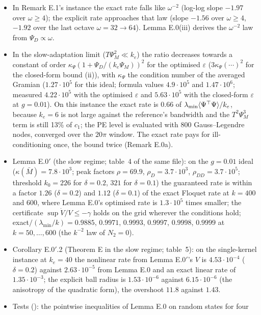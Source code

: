 \begin{itemize}
  \item In Remark E.1's instance the exact rate falls like $\omega^{-2}$ (log-log slope $-1.97$ over $\omega\ge4$);
    the explicit rate approaches that law (slope $-1.56$ over $\omega\ge4$, $-1.92$ over the last octave
    $\omega=32\to64$). Lemma E.0(iii) derives the $\omega^{-2}$ law from $\Psi_D\propto\omega$.
  \item In the slow-adaptation limit ($T\Psi_M^2\ll k_e$) the ratio decreases towards a constant of order
    $\kappa_\Psi(1+\Psi_D/(k_e\Psi_M))^2$ for the optimised $\varepsilon$ ($3\kappa_\Psi(\cdots)^2$ for the
    closed-form bound (ii)), with $\kappa_\Psi$ the condition number of the averaged Gramian ($1.27\cdot10^5$ for this
    ideal; formula values $4.9\cdot10^5$ and $1.47\cdot10^6$; measured $4.22\cdot10^5$ with the optimised $\varepsilon$
    and $5.63\cdot10^5$ with the closed-form $\varepsilon$ at $g=0.01$). On this instance the exact rate is $0.66$ of
    $\lambda_{\min}\langle\Psi^\top\Psi\rangle/k_e$, because $k_e=6$ is not large against the reference's bandwidth and
    the $T^2\Psi_M^3$ term is still 13\% of $c_1$; the PE level is evaluated with 800 Gauss--Legendre nodes, converged
    over the $20\pi$ window. The exact rate pays for ill-conditioning once, the bound twice (Remark E.0a).
  \item Lemma E.0$'$ (the slow regime; table~4 of the same file): on the $g=0.01$ ideal ($\kappa(\bar M)=7.8\cdot10^3$;
    peak factors $\rho=69.9$, $\rho_D=3.7\cdot10^3$, $\rho_{DD}=3.7\cdot10^5$; threshold $k_0=226$ for $\delta=0.2$,
    $321$ for $\delta=0.1$) the guaranteed rate is within a factor $1.26$ ($\delta=0.2$) and $1.12$ ($\delta=0.1$) of
    the exact Floquet rate at $k=400$ and $600$, where Lemma E.0's optimised rate is $1.3\cdot10^5$ times smaller; the
    certificate $\sup\dot V/V\le-\gamma$ holds on the grid wherever the conditions hold;
    exact$/(\lambda_{\min}/k)=0.9885$, $0.9971$, $0.9993$, $0.9997$, $0.9998$, $0.9999$ at $k=50,\dots,600$ (the
    $k^{-2}$ law of $N_2=0$).
  \item Corollary E.0$'$.2 (Theorem E in the slow regime; table~5): on the single-kernel instance at $k_e=40$ the
    nonlinear rate from Lemma E.0$'$'s $V$ is $4.53\cdot10^{-4}$ ($\delta=0.2$) against $2.63\cdot10^{-5}$ from
    Lemma E.0 and an exact linear rate of $1.35\cdot10^{-3}$; the explicit ball radius is $1.53\cdot10^{-6}$ against
    $6.15\cdot10^{-6}$ (the anisotropy of the quadratic form), the overshoot $11.8$ against $1.43$.
  \item Tests (): the pointwise inequalities of Lemma E.0 on random states for four

\end{itemize}

